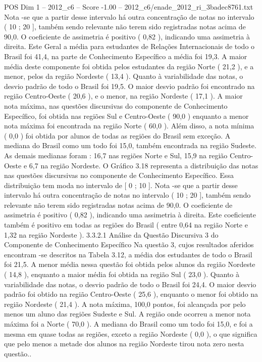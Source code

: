 \begin{textsample}{POS Dim 1 – 2012\_c6 – Score -1.00 – 2012\_c6/enade\_2012\_ri\_3badec8761.txt}
Nota -se que a partir desse intervalo há outra concentração de notas no intervalo ( 10 ; 20 ], também sendo relevante não terem sido registradas notas acima de 90,0.
O coeficiente de assimetria é positivo ( 0,82 ), indicando uma assimetria à direita.
Este Geral a média para estudantes de Relações Internacionais de todo o Brasil foi 41,4, na parte de Conhecimento Específico a média foi 19,3.
A maior média deste componente foi obtida pelos estudantes da região Norte ( 21,2 ), e a menor, pelos da região Nordeste ( 13,4 ).
Quanto à variabilidade das notas, o desvio padrão de todo o Brasil foi 19,5.
O maior desvio padrão foi encontrado na região Centro-Oeste ( 20,6 ), e o menor, na região Nordeste ( 17,1 ).
A maior nota máxima, nas questões discursivas do componente de Conhecimento Específico, foi obtida nas regiões Sul e Centro-Oeste ( 90,0 ) enquanto a menor nota máxima foi encontrada na região Norte ( 60,0 ).
Além disso, a nota mínima ( 0,0 ) foi obtida por alunos de todas as regiões do Brasil sem exceção.
A mediana do Brasil como um todo foi 15,0, também encontrada na região Sudeste.
As demais medianas foram : 16,7 nas regiões Norte e Sul, 15,9 na região Centro-Oeste e 6,7 na região Nordeste.
O Gráfico 3.18 representa a distribuição das notas nas questões discursivas no componente de Conhecimento Específico.
Essa distribuição tem moda no intervalo de [ 0 ; 10 ].
Nota -se que a partir desse intervalo há outra concentração de notas no intervalo ( 10 ; 20 ], também sendo relevante não terem sido registradas notas acima de 90,0.
O coeficiente de assimetria é positivo ( 0,82 ), indicando uma assimetria à direita.
Este coeficiente também é positivo em todas as regiões do Brasil ( entre 0,64 na região Norte e 1,32 na região Nordeste ). 3.3.2.1 Análise da Questão Discursiva 3 do Componente de Conhecimento Específico Na questão 3, cujos resultados aferidos encontram -se descritos na Tabela 3.12, a média dos estudantes de todo o Brasil foi 21,5.
A menor média nessa questão foi obtida pelos alunos da região Nordeste ( 14,8 ), enquanto a maior média foi obtida na região Sul ( 23,0 ).
Quanto à variabilidade das notas, o desvio padrão de todo o Brasil foi 24,4.
O maior desvio padrão foi obtido na região Centro-Oeste ( 25,6 ), enquanto o menor foi obtido na região Nordeste ( 21,4 ).
A nota máxima, 100,0 pontos, foi alcançada por pelo menos um aluno das regiões Sudeste e Sul.
A região onde ocorreu a menor nota máxima foi a Norte ( 70,0 ).
A mediana do Brasil como um todo foi 15,0, e foi a mesma em quase todas as regiões, exceto a região Nordeste ( 0,0 ), o que significa que pelo menos a metade dos alunos na região Nordeste tirou nota zero nesta questão..

\end{textsample}
